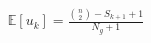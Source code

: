 \documentclass[preview]{standalone}
\begin{document}
\begin{align*}
\mathbb{E}[u_k] = \frac{\binom{n}{2} - S_{k+1} + 1}{N_g+1}
\end{align*}
\end{document}
